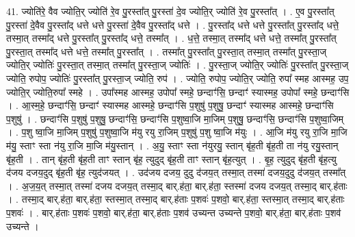 \documentclass[17pt]{extarticle}
\begin{document}
41. ज्योति॑रे॒ वैव ज्योति॒र् ज्योति॑ रे॒व पु॒रस्ता᳚त् पु॒रस्ता॑ दे॒व ज्योति॒र् ज्योति॑ रे॒व पु॒रस्ता᳚त् । . ए॒व पु॒रस्ता᳚त् पु॒रस्ता॑ दे॒वैव पु॒रस्ता᳚द् धत्ते धत्ते पु॒रस्ता॑ दे॒वैव पु॒रस्ता᳚द् धत्ते । . पु॒रस्ता᳚द् धत्ते धत्ते पु॒रस्ता᳚त् पु॒रस्ता᳚द् धत्ते॒ तस्मा॒त् तस्मा᳚द् धत्ते पु॒रस्ता᳚त् पु॒रस्ता᳚द् धत्ते॒ तस्मा᳚त् । . ध॒त्ते॒ तस्मा॒त् तस्मा᳚द् धत्ते धत्ते॒ तस्मा᳚त् पु॒रस्ता᳚त् पु॒रस्ता॒त् तस्मा᳚द् धत्ते धत्ते॒ तस्मा᳚त् पु॒रस्ता᳚त् । . तस्मा᳚त् पु॒रस्ता᳚त् पु॒रस्ता॒त् तस्मा॒त् तस्मा᳚त् पु॒रस्ता॒ज् ज्योति॒र् ज्योतिः॑ पु॒रस्ता॒त् तस्मा॒त् तस्मा᳚त् पु॒रस्ता॒ज् ज्योतिः॑ । . पु॒रस्ता॒ज् ज्योति॒र् ज्योतिः॑ पु॒रस्ता᳚त् पु॒रस्ता॒ज् ज्योति॒ रुपोप॒ ज्योतिः॑ पु॒रस्ता᳚त् पु॒रस्ता॒ज् ज्योति॒ रुप॑ । . ज्योति॒ रुपोप॒ ज्योति॒र् ज्योति॒ रुपा᳚ स्मह आस्मह॒ उप॒ ज्योति॒र् ज्योति॒रुपा᳚ स्महे । . उपा᳚स्मह आस्मह॒ उपोपा᳚ स्महे॒ छन्दाꣳ॑सि॒ छन्दाꣳ॑ स्यास्मह॒ उपोपा᳚ स्महे॒ छन्दाꣳ॑सि । . आ॒स्म॒हे॒ छन्दाꣳ॑सि॒ छन्दाꣳ॑ स्यास्मह आस्महे॒ छन्दाꣳ॑सि प॒शुषु॑ प॒शुषु॒ छन्दाꣳ॑ स्यास्मह आस्महे॒ छन्दाꣳ॑सि प॒शुषु॑ । . छन्दाꣳ॑सि प॒शुषु॑ प॒शुषु॒ छन्दाꣳ॑सि॒ छन्दाꣳ॑सि प॒शुष्वा॒जि मा॒जिम् प॒शुषु॒ छन्दाꣳ॑सि॒ छन्दाꣳ॑सि प॒शुष्वा॒जिम् । . प॒शु ष्वा॒जि मा॒जिम् प॒शुषु॑ प॒शुष्वा॒जि म॑यु रयु रा॒जिम् प॒शुषु॑ प॒शु ष्वा॒जि म॑युः । . आ॒जि म॑यु रयु रा॒जि मा॒जि म॑यु॒ स्ताꣳ स्ता न॑यु रा॒जि मा॒जि म॑यु॒स्तान् । . अ॒यु॒ स्ताꣳ स्ता न॑युरयु॒ स्तान् बृ॑ह॒ती बृ॑ह॒ती ता न॑यु रयु॒स्तान् बृ॑ह॒ती । . तान् बृ॑ह॒ती बृ॑ह॒ती ताꣳ स्तान् बृ॑ह॒ त्युदुद् बृ॑ह॒ती ताꣳ स्तान् बृ॑ह॒त्युत् । . बृ॒ह॒ त्युदुद् बृ॑ह॒ती बृ॑ह॒त्यु द॑जय दजय॒दुद् बृ॑ह॒ती बृ॑ह॒ त्युद॑जयत् । . उद॑जय दजय॒ दुदु द॑जय॒त् तस्मा॒त् तस्मा॑ दजय॒दुदु द॑जय॒त् तस्मा᳚त् । . अ॒ज॒य॒त् तस्मा॒त् तस्मा॑ दजय दजय॒त् तस्मा॒द् बार्.ह॑ता॒ बार्.ह॑ता॒ स्तस्मा॑ दजय दजय॒त् तस्मा॒द् बार्.ह॑ताः । . तस्मा॒द् बार्.ह॑ता॒ बार्.ह॑ता॒ स्तस्मा॒त् तस्मा॒द् बार्.ह॑ताः प॒शवः॑ प॒शवो॒ बार्.ह॑ता॒ स्तस्मा॒त् तस्मा॒द् बार्.ह॑ताः प॒शवः॑ । . बार्.ह॑ताः प॒शवः॑ प॒शवो॒ बार्.ह॑ता॒ बार्.ह॑ताः प॒शव॑ उच्यन्त उच्यन्ते प॒शवो॒ बार्.ह॑ता॒ बार्.ह॑ताः प॒शव॑ उच्यन्ते । \newline
\pagebreak
{}
\end{document}
